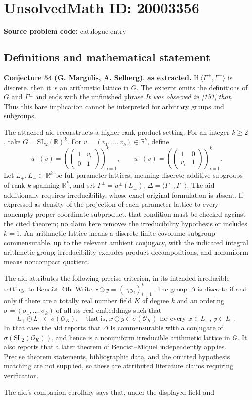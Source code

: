 \documentclass[11pt]{article}
\newcommand{\R}{\mathbb{R}}
\begin{document}
\section*{UnsolvedMath ID: 20003356}
\textbf{Source problem code:} catalogue entry
\subsection{Definitions and mathematical statement}
\textbf{Conjecture 54 (G. Margulis, A. Selberg), as extracted.} If \(\langle\Gamma^+,\Gamma^-\rangle\) is discrete, then it is an arithmetic lattice in \(G\). The excerpt omits the definitions of \(G\) and \(\Gamma^\pm\) and ends with the unfinished phrase \emph{It was observed in [151] that}. Thus this bare implication cannot be interpreted for arbitrary groups and subgroups.\par The attached aid reconstructs a higher-rank product setting. For an integer \(k\ge2\), take \(G=\mathrm{SL}_2(\R)^k\). For \(v=(v_1,\ldots,v_k)\in\R^k\), define\[u^+(v)=\left(\begin{pmatrix}1&v_i\\0&1\end{pmatrix}\right)_{i=1}^k,\qquad u^-(v)=\left(\begin{pmatrix}1&0\\v_i&1\end{pmatrix}\right)_{i=1}^k.\] Let \(L_+,L_-\subset\R^k\) be full parameter lattices, meaning discrete additive subgroups of rank \(k\) spanning \(\R^k\), and set \(\Gamma^\pm=u^\pm(L_\pm)\), \(\Delta=\langle\Gamma^+,\Gamma^-\rangle\). The aid additionally requires irreducibility, whose exact original formulation is absent. If expressed as density of the projection of each parameter lattice to every nonempty proper coordinate subproduct, that condition must be checked against the cited theorem; no claim here removes the irreducibility hypothesis or includes \(k=1\). An arithmetic lattice means a discrete finite-covolume subgroup commensurable, up to the relevant ambient conjugacy, with the indicated integral arithmetic group; irreducibility excludes product decompositions, and nonuniform means noncompact quotient.\par The aid attributes the following precise criterion, in its intended irreducible setting, to Benoist--Oh. Write \(x\odot y=(x_iy_i)_{i=1}^k\). The group \(\Delta\) is discrete if and only if there are a totally real number field \(K\) of degree \(k\) and an ordering \(\sigma=(\sigma_1,\ldots,\sigma_k)\) of all its real embeddings such that\[L_+\odot L_-\subset\sigma(\mathcal O_K),\quad\text{that is, }x\odot y\in\sigma(\mathcal O_K)\text{ for every }x\in L_+,\ y\in L_-.\] In that case the aid reports that \(\Delta\) is commensurable with a conjugate of \(\sigma(\mathrm{SL}_2(\mathcal O_K))\), and hence is a nonuniform irreducible arithmetic lattice in \(G\). It also reports that a later theorem of Benoist--Miquel independently applies. Precise theorem statements, bibliographic data, and the omitted hypothesis matching are not supplied, so these are attributed literature claims requiring verification.\par The aid's companion corollary says that, under the displayed field and 
\end{document}
